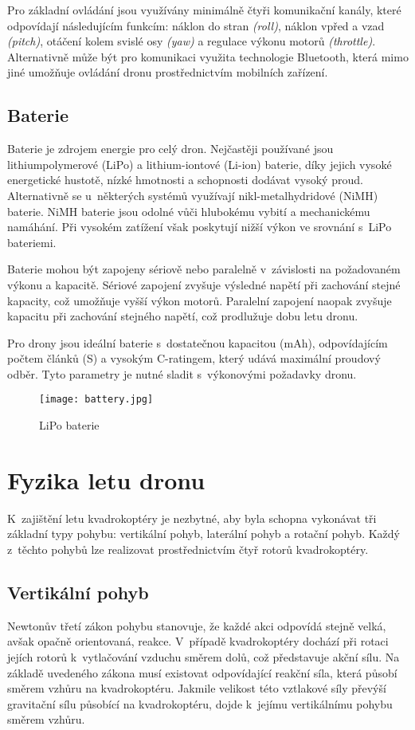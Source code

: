 \documentclass[12pt]{report}
\begin{document}
Pro základní ovládání jsou využívány minimálně čtyři komunikační kanály, které odpovídají následujícím funkcím: náklon do stran \textit{(roll)}, náklon vpřed a vzad \textit{(pitch)}, otáčení kolem svislé osy \textit{(yaw)} a regulace výkonu motorů \textit{(throttle)}. Alternativně může být pro komunikaci využita technologie Bluetooth, která mimo jiné umožňuje ovládání dronu prostřednictvím mobilních zařízení.

\section[Baterie]{Baterie}

Baterie je zdrojem energie pro celý dron. Nejčastěji používané jsou lithiumpolymerové (LiPo) a lithium-iontové (Li-ion) baterie, díky jejich vysoké energetické hustotě, nízké hmotnosti a schopnosti dodávat vysoký proud. Alternativně se u~některých systémů využívají nikl-metalhydridové (NiMH) baterie. NiMH baterie jsou odolné vůči hlubokému vybití a mechanickému namáhání. Při vysokém zatížení však poskytují nižší výkon ve srovnání s~LiPo bateriemi.

Baterie mohou být zapojeny sériově nebo paralelně v~závislosti na požadovaném výkonu a kapacitě. Sériové zapojení zvyšuje výsledné napětí při zachování stejné kapacity, což umožňuje vyšší výkon motorů. Paralelní zapojení naopak zvyšuje kapacitu při zachování stejného napětí, což prodlužuje dobu letu dronu.

Pro drony jsou ideální baterie s~dostatečnou kapacitou (mAh), odpovídajícím počtem článků (S) a vysokým C-ratingem, který udává maximální proudový odběr. Tyto parametry je nutné sladit s~výkonovými požadavky dronu. \cite{mainbook}

\begin{figure}[H]
	\centering
	\texttt{[image: battery.jpg]}
	\caption{LiPo baterie \cite{dojo}}
	\label{fig:battery.jpg}
\end{figure}

\chapter[Fyzika letu dron]{Fyzika letu dronu}
K~zajištění letu kvadrokoptéry je nezbytné, aby byla schopna vykonávat tři základní typy pohybu: vertikální pohyb, laterální pohyb a rotační pohyb. Každý z~těchto pohybů lze realizovat prostřednictvím čtyř rotorů kvadrokoptéry.

\section[Vertikální pohyb]{Vertikální pohyb}
Newtonův třetí zákon pohybu stanovuje, že každé akci odpovídá stejně velká, avšak opačně orientovaná, reakce. V~případě kvadrokoptéry dochází při rotaci jejích rotorů k~vytlačování vzduchu směrem dolů, což představuje akční sílu. Na základě uvedeného zákona musí existovat odpovídající reakční síla, která působí směrem vzhůru na kvadrokoptéru. Jakmile velikost této vztlakové síly převýší gravitační sílu působící na kvadrokoptéru, dojde k~jejímu vertikálnímu pohybu směrem vzhůru.
\end{document}

